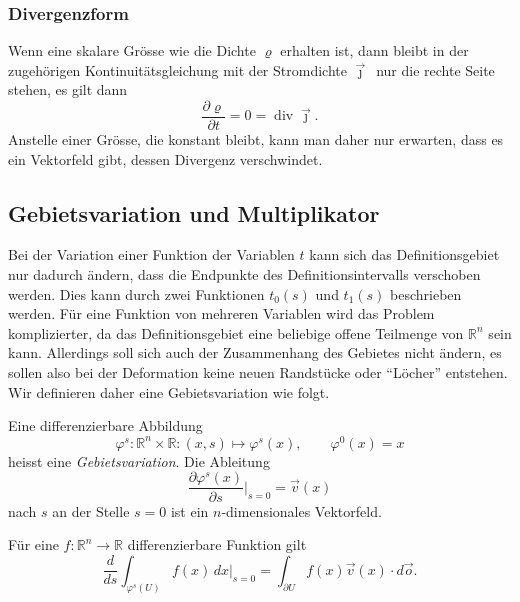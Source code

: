 %
%
\subsubsection{Divergenzform}
%
Wenn eine skalare Grösse wie die Dichte $\varrho$ erhalten ist, dann bleibt
in der zugehörigen Kontinuitätsgleichung mit der Stromdichte
$\vec{\jmath}$\, nur die rechte Seite stehen, es gilt dann
\[
\frac{\partial\varrho}{\partial t}
=
0
=
\operatorname{div} \vec{\jmath}.
\]
Anstelle einer Grösse, die konstant bleibt, kann man daher nur erwarten,
dass es ein Vektorfeld gibt, dessen Divergenz verschwindet.

%
%
\subsection{Gebietsvariation und Multiplikator}
Bei der Variation einer Funktion der Variablen $t$ kann sich das
Definitionsgebiet nur dadurch ändern, dass die Endpunkte des
Definitionsintervalls verschoben werden.
Dies kann durch zwei Funktionen $t_0(s)$ und $t_1(s)$ beschrieben werden.
Für eine Funktion von mehreren Variablen wird das Problem komplizierter,
da das Definitionsgebiet eine beliebige offene Teilmenge von $\mathbb{R}^n$
sein kann.
Allerdings soll sich auch der Zusammenhang des Gebietes nicht ändern,
es sollen also bei der Deformation keine neuen Randstücke oder ``Löcher''
entstehen.
Wir definieren daher eine Gebietsvariation wie folgt.

\begin{definition}
Eine differenzierbare Abbildung
\[
\varphi^s
\colon
\mathbb{R}^n\times \mathbb{R}
:
(x,s)
\mapsto
\varphi^s(x),
\qquad
\varphi^0(x)=x
\]
heisst eine {\em Gebietsvariation}.
%
Die Ableitung
\[
\frac{\partial \varphi^s(x)}{\partial s}\bigg|_{s=0}
=
\vec{v}(x)
\]
nach $s$ an der Stelle $s=0$ ist ein $n$-dimensionales Vektorfeld.
\end{definition}

%

\begin{satz}
\label{buch:symmetrien:felder:satz:gebietsintegral}
Für eine $f\colon \mathbb{R}^n\to\mathbb{R}$ differenzierbare Funktion
gilt
\begin{equation}
\frac{d}{ds}
\int_{\varphi^s(U)}
f(x)\,dx
\bigg|_{s=0}
=
\int_{\partial U} f(x)\vec{v}(x)\cdot d\vec{o}.
\label{buch:symmetrien:felder:eqn:gebietsintegral}
\end{equation}
\end{satz}


